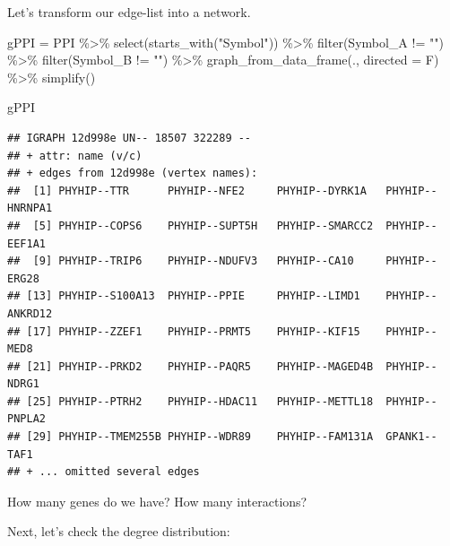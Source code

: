 \documentclass[
]{book}
\newenvironment{Shaded}{\begin{snugshade}}{\end{snugshade}}
\newcommand{\AttributeTok}[1]{\textcolor[rgb]{0.77,0.63,0.00}{#1}}
\newcommand{\FunctionTok}[1]{\textcolor[rgb]{0.00,0.00,0.00}{#1}}
\newcommand{\NormalTok}[1]{#1}
\newcommand{\OtherTok}[1]{\textcolor[rgb]{0.56,0.35,0.01}{#1}}
\newcommand{\SpecialCharTok}[1]{\textcolor[rgb]{0.00,0.00,0.00}{#1}}
\newcommand{\StringTok}[1]{\textcolor[rgb]{0.31,0.60,0.02}{#1}}
\begin{document}
Let's transform our edge-list into a network.

\begin{Shaded}
\begin{Highlighting}[]
\NormalTok{gPPI }\OtherTok{=}\NormalTok{ PPI }\SpecialCharTok{\%\textgreater{}\%} 
  \FunctionTok{select}\NormalTok{(}\FunctionTok{starts\_with}\NormalTok{(}\StringTok{"Symbol"}\NormalTok{)) }\SpecialCharTok{\%\textgreater{}\%}
  \FunctionTok{filter}\NormalTok{(Symbol\_A }\SpecialCharTok{!=} \StringTok{""}\NormalTok{) }\SpecialCharTok{\%\textgreater{}\%}
  \FunctionTok{filter}\NormalTok{(Symbol\_B }\SpecialCharTok{!=} \StringTok{""}\NormalTok{) }\SpecialCharTok{\%\textgreater{}\%}
  \FunctionTok{graph\_from\_data\_frame}\NormalTok{(., }\AttributeTok{directed =}\NormalTok{ F) }\SpecialCharTok{\%\textgreater{}\%}
  \FunctionTok{simplify}\NormalTok{()}

\NormalTok{gPPI}
\end{Highlighting}
\end{Shaded}

\begin{verbatim}
## IGRAPH 12d998e UN-- 18507 322289 -- 
## + attr: name (v/c)
## + edges from 12d998e (vertex names):
##  [1] PHYHIP--TTR      PHYHIP--NFE2     PHYHIP--DYRK1A   PHYHIP--HNRNPA1 
##  [5] PHYHIP--COPS6    PHYHIP--SUPT5H   PHYHIP--SMARCC2  PHYHIP--EEF1A1  
##  [9] PHYHIP--TRIP6    PHYHIP--NDUFV3   PHYHIP--CA10     PHYHIP--ERG28   
## [13] PHYHIP--S100A13  PHYHIP--PPIE     PHYHIP--LIMD1    PHYHIP--ANKRD12 
## [17] PHYHIP--ZZEF1    PHYHIP--PRMT5    PHYHIP--KIF15    PHYHIP--MED8    
## [21] PHYHIP--PRKD2    PHYHIP--PAQR5    PHYHIP--MAGED4B  PHYHIP--NDRG1   
## [25] PHYHIP--PTRH2    PHYHIP--HDAC11   PHYHIP--METTL18  PHYHIP--PNPLA2  
## [29] PHYHIP--TMEM255B PHYHIP--WDR89    PHYHIP--FAM131A  GPANK1--TAF1    
## + ... omitted several edges
\end{verbatim}

How many genes do we have? How many interactions?

Next, let's check the degree distribution:
\end{document}
